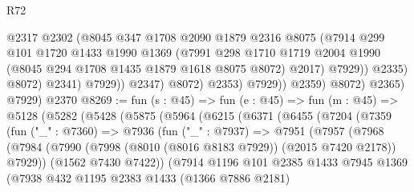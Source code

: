 \begin{lexlean}{R72}
\begin{coremodule}
                                @2317
                                @2302
                                (@8045
                                  @347
                                  @1708
                                  @2090
                                  @1879
                                  @2316
                                  @8075
                                  (@7914
                                    @299
                                    @101
                                    @1720
                                    @1433
                                    @1990
                                    @1369
                                    (@7991
                                      @298
                                      @1710
                                      @1719
                                      @2004
                                      @1990
                                      (@8045 @294 @1708 @1435 @1879 @1618 @8075 @8072)
                                      @2017)
                                    @7929))
                                @2335)
                              @8072)
                            @2341)
                          @7929))
                      @2347)
                    @8072)
                  @2353)
                @7929))
            @2359)
          @8072)
        @2365)
      @7929)
    @2370
@8269 := fun (s : @45) =>
  fun (e : @45) =>
  fun (m : @45) =>
  @5128
    (@5282
      (@5428
        (@5875
          (@5964
            (@6215
              (@6371
                (@6455
                  (@7204
                    (@7359
                      (fun ("_" : @7360) =>
                      @7936
                        (fun ("_" : @7937) =>
                        @7951
                          (@7957
                            (@7968
                              (@7984
                                (@7990
                                  (@7998 (@8010 (@8016 @8183 @7929)) (@2015 @7420 @2178))
                                  @7929))
                              (@1562 @7430 @7422))
                            (@7914
                              @1196
                              @101
                              @2385
                              @1433
                              @7945
                              @1369
                              (@7938
                                @432
                                @1195
                                @2383
                                @1433
                                (@1366 @7886 @2181)

\end{coremodule}
\end{lexlean}
